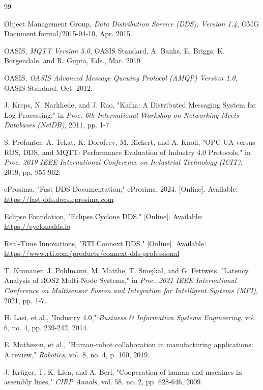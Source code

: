 \begin{thebibliography}{99}

 Object Management Group, \textit{Data Distribution Service (DDS), Version 1.4}, OMG Document formal/2015-04-10, Apr. 2015.

 OASIS, \textit{MQTT Version 5.0}, OASIS Standard, A. Banks, E. Briggs, K. Borgendale, and R. Gupta, Eds., Mar. 2019.

 OASIS, \textit{OASIS Advanced Message Queuing Protocol (AMQP) Version 1.0}, OASIS Standard, Oct. 2012.

 J. Kreps, N. Narkhede, and J. Rao, "Kafka: A Distributed Messaging System for Log Processing," in \textit{Proc. 6th International Workshop on Networking Meets Databases (NetDB)}, 2011, pp. 1-7.

 S. Profanter, A. Tekat, K. Dorofeev, M. Rickert, and A. Knoll, "OPC UA versus ROS, DDS, and MQTT: Performance Evaluation of Industry 4.0 Protocols," in \textit{Proc. 2019 IEEE International Conference on Industrial Technology (ICIT)}, 2019, pp. 955-962.

 eProsima, "Fast DDS Documentation," eProsima, 2024. [Online]. Available: \url{https://fast-dds.docs.eprosima.com}

 Eclipse Foundation, "Eclipse Cyclone DDS." [Online]. Available: \url{https://cyclonedds.io}

 Real-Time Innovations, "RTI Connext DDS." [Online]. Available: \url{https://www.rti.com/products/connext-dds-professional}

 T. Kronauer, J. Pohlmann, M. Matthe, T. Smejkal, and G. Fettweis, "Latency Analysis of ROS2 Multi-Node Systems," in \textit{Proc. 2021 IEEE International Conference on Multisensor Fusion and Integration for Intelligent Systems (MFI)}, 2021, pp. 1-7.

 H. Lasi, et al., "Industry 4.0," \textit{Business \& Information Systems Engineering}, vol. 6, no. 4, pp. 239-242, 2014.

 E. Matheson, et al., "Human-robot collaboration in manufacturing applications: A review," \textit{Robotics}, vol. 8, no. 4, p. 100, 2019.

 J. Kr{\"u}ger, T. K. Lien, and A. Berl, "Cooperation of human and machines in assembly lines," \textit{CIRP Annals}, vol. 58, no. 2, pp. 628-646, 2009.


\end{thebibliography}

